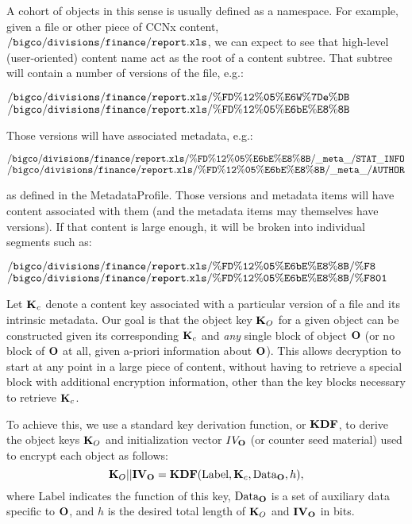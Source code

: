 A cohort of objects in this sense is usually defined as a
namespace. For example, given a file or other piece of CCNx content,
$\ccnxpath{/bigco/divisions/finance/report.xls}$, we can expect to see
that high-level (user-oriented) content name act as the root of a
content subtree. That subtree will contain a number of versions of the
file, e.g.:
\begin{flushleft}
  $\ccnxpath{/bigco/divisions/finance/report.xls/\%FD\%12\%05\%E6W\%7De\%DB}$ \\ $\ccnxpath{/bigco/divisions/finance/report.xls/\%FD\%12\%05\%E6bE\%E8\%8B}$
\end{flushleft}
Those versions will have associated metadata, e.g.:
\begin{flushleft}
  $\ccnxpath{/bigco/divisions/finance/report.xls/\%FD\%12\%05\%E6bE\%E8\%8B/\_meta\_/STAT\_INFO}$ \\ $\ccnxpath{/bigco/divisions/finance/report.xls/\%FD\%12\%05\%E6bE\%E8\%8B/\_meta\_/AUTHOR}$
\end{flushleft}
as defined in the MetadataProfile. Those versions and metadata items
will have content associated with them (and the metadata items may
themselves have versions). If that content is large enough, it will be
broken into individual segments such as:
\begin{flushleft}
  $\ccnxpath{/bigco/divisions/finance/report.xls/\%FD\%12\%05\%E6bE\%E8\%8B/\%F8}$ \\ $\ccnxpath{/bigco/divisions/finance/report.xls/\%FD\%12\%05\%E6bE\%E8\%8B/\%F801}$
\end{flushleft}
Let ${\textbf{K}_c}$ denote a content key associated with a particular version of
a file and its intrinsic metadata. Our goal is that the object key
${\textbf{K}_O}$ for a given object can be constructed given its corresponding
${\textbf{K}_c}$ and \emph{any} single block of object ${\textbf{O}}$ (or no block of
${\textbf{O}}$ at all, given a-priori information about ${\textbf{O}}$). This allows
decryption to start at any point in a large piece of content, without
having to retrieve a special block with additional encryption
information, other than the key blocks necessary to retrieve ${\textbf{K}_c}$.

To achieve this, we use a standard key derivation function, or ${\textbf{KDF}}$,
to derive the object keys ${\textbf{K}_O}$ and initialization vector $IV_{{\textbf{O}}}$
(or counter seed material) used to encrypt each object as follows:
$${\textbf{K}_O} || {\textbf{IV}}_{{\textbf{O}}} = {\textbf{KDF}}(\mbox{Label}, {\textbf{K}_c}, \mbox{Data}_{{\textbf{O}}}, h),$$
where $\mbox{Label}$ indicates the function of this key,
$\mbox{Data}_{{\textbf{O}}}$ is a set of auxiliary data specific to ${\textbf{O}}$,
and $h$ is the desired total length of ${\textbf{K}_O}$ and ${\textbf{IV}}_{{\textbf{O}}}$ in bits.

